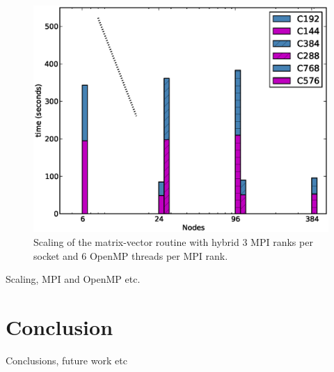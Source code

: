 \documentclass[review,times]{elsarticle}
\begin{document}
\begin{figure}
  \begin{center}
    \includegraphics[width=0.9\linewidth]{strong_mv_T6.eps}
    \caption{\label{fig:scale_T6}Scaling of the matrix-vector routine 
      with hybrid 3 MPI ranks per socket and 6 OpenMP threads per MPI rank.}
  \end{center}
\end{figure}

Scaling, MPI and OpenMP etc.

\section{Conclusion}
\label{sec:con}
Conclusions, future work etc
\newpage


\end{document}
